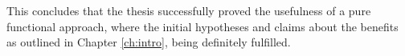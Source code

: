 \medskip

This concludes that the thesis successfully proved the usefulness of a pure functional approach, where the initial hypotheses and claims about the benefits as outlined in Chapter \ref{ch:intro}, being definitely fulfilled.
 
%





%



